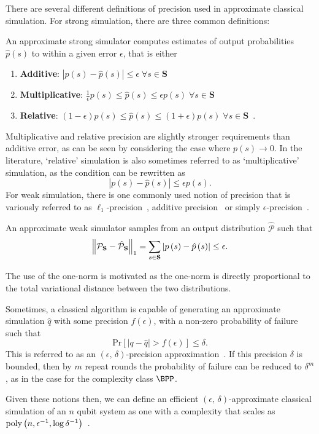 There are several different definitions of precision used in approximate classical simulation. For strong simulation, there are three common definitions:
\begin{defn}\label{def:approximate_strong}
An approximate strong simulator computes estimates of output probabilities $\hat{p}\left(s\right)$ to within a given error $\epsilon$, that is either
\begin{enumerate}
    \item \textbf{Additive}: $\left|p\left(s\right)-\hat{p}\left(s\right)\right| \leq \epsilon\;\forall s\in\mathbf{S}$~\cite{Pashayan2017}
    \item \textbf{Multiplicative}: $\frac{1}{\epsilon}p\left(s\right)\leq \hat{p}\left(s\right) \leq \epsilon p\left(s\right)\;\forall s\in\mathbf{S}$~\cite{Hangleiter2017}
    \item \textbf{Relative}: $\left(1-\epsilon\right)p\left(s\right) \leq \hat{p}\left(s\right) \leq \left(1+\epsilon\right)p\left(s\right) \;\forall s\in\mathbf{S} $~\cite{Bravyi2016,Hangleiter2017}.
\end{enumerate}
\end{defn}
Multiplicative and relative precision are slightly stronger requirements than additive error, as can be seen by considering the case where $p\left(s\right)\rightarrow 0$. In the literature, `relative' simulation is also sometimes referred to as `multiplicative' simulation, as the condition can be rewritten as~\cite{Pashayan2017}
\[\left|p\left(s\right)-\hat{p}\left(s\right)\right| \leq \epsilon p\left(s\right).\]
For weak simulation, there is one commonly used notion of precision that is variously referred to as $\ell_{1}$-precision~\cite{Bremner2011}, additive precision~\cite{Yoganathan2019} or simply $\epsilon$-precision~\cite{Pashayan2017}.
\begin{defn}\label{def:approximate_weak}
An approximate weak simulator samples from an output distribution $\hat{\mathcal{P}}$ such that
\[ \norm{\mathcal{P}_{\mathbf{S}}-\hat{\mathcal{P}}_{\mathbf{S}}}_{1} = \sum_{s\in \mathbf{S}} \left| p\left(s\right) - \hat{p}\left(s\right)\right| \leq \epsilon.\]
\end{defn}
The use of the one-norm is motivated as the one-norm is directly proportional to the total variational distance between the two distributions.\par
Sometimes, a classical algorithm is capable of generating an approximate simulation $\hat{q}$ with some precision $f\left(\epsilon\right)$, with a non-zero probability of failure such that
\[\text{Pr}\left[\left|q-\hat{q}\right| > f\left(\epsilon\right)\right]\leq \delta.\]
This is referred to as an $\left(\epsilon,\,\delta\right)$-precision approximation~\cite{Pashayan2017}. If this precision $\delta$ is bounded, then by $m$ repeat rounds the probability of failure can be reduced to $\delta^{m}$, as in the case for the complexity class $\BPP$.\par
Given these notions then, we can define an efficient $\left(\epsilon,\,\delta\right)$-approximate classical simulation of an $n$ qubit system as one with a complexity that scales as $\text{poly} \left(n, \epsilon^{-1}, \log{\delta^{-1}}\right)$~\cite{Pashayan2017}.

